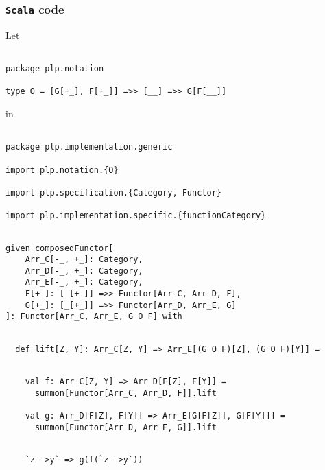 \documentclass[11pt]{article}
\newcommand{\code}{\subsubsection{{\tt Scala} code}\begingroup\rm \vspace{12pt}}
\def\edefn{\endgroup\par\pagebreak[2]\addvspace{\medskipamount}}
\let\ecode=\edefn
\begin{document}
\clearpage

\code
Let

\vspace{6pt}
\begin{mdframed}[backgroundcolor=lightgray!20] 
\begin{lstlisting}

package plp.notation

type O = [G[+_], F[+_]] =>> [__] =>> G[F[__]]
\end{lstlisting}
\end{mdframed}

in

\vspace{6pt}
\begin{mdframed}[backgroundcolor=lightgray!20] 
\begin{lstlisting}

package plp.implementation.generic

import plp.notation.{O}

import plp.specification.{Category, Functor}

import plp.implementation.specific.{functionCategory}
\end{lstlisting}
\end{mdframed}
\vspace{6pt}
\begin{mdframed}[backgroundcolor=lightgray!20] 
\begin{lstlisting}

given composedFunctor[
    Arr_C[-_, +_]: Category,
    Arr_D[-_, +_]: Category,
    Arr_E[-_, +_]: Category,
    F[+_]: [_[+_]] =>> Functor[Arr_C, Arr_D, F],
    G[+_]: [_[+_]] =>> Functor[Arr_D, Arr_E, G]
]: Functor[Arr_C, Arr_E, G O F] with
\end{lstlisting}
\end{mdframed}
\vspace{6pt}
\begin{mdframed}[backgroundcolor=lightgray!20] 
\begin{lstlisting}

  def lift[Z, Y]: Arr_C[Z, Y] => Arr_E[(G O F)[Z], (G O F)[Y]] =
\end{lstlisting}
\end{mdframed}
\vspace{6pt}
\begin{mdframed}[backgroundcolor=lightgray!20] 
\begin{lstlisting}

    val f: Arr_C[Z, Y] => Arr_D[F[Z], F[Y]] =
      summon[Functor[Arr_C, Arr_D, F]].lift

    val g: Arr_D[F[Z], F[Y]] => Arr_E[G[F[Z]], G[F[Y]]] =
      summon[Functor[Arr_D, Arr_E, G]].lift

\end{lstlisting}
\end{mdframed}
\vspace{6pt}
\begin{mdframed}[backgroundcolor=lightgray!20] 
\begin{lstlisting}

    `z-->y` => g(f(`z-->y`))
\end{lstlisting}
\end{mdframed}
\ecode
\end{document}
